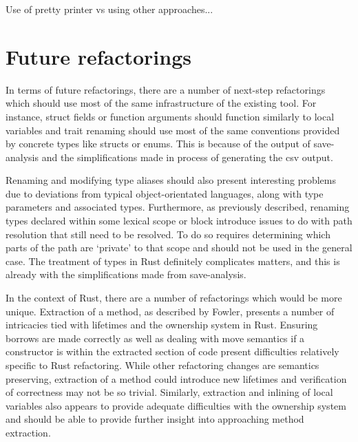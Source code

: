 Use of pretty printer vs using other approaches...

\section{Future refactorings}
In terms of future refactorings, there are a number of next-step refactorings which should use most of the same infrastructure of the existing tool. For instance, struct fields or function arguments should function similarly to local variables and trait renaming should use most of the same conventions provided by concrete types like structs or enums. This is because of the output of save-analysis and the simplifications made in process of generating the csv output.


Renaming and modifying type aliases should also present interesting problems due to deviations from typical object-orientated languages, along with type parameters and associated types. Furthermore, as previously described, renaming types declared within some lexical scope or block introduce issues to do with path resolution that still need to be resolved. To do so requires determining which parts of the path are `private' to that scope and should not be used in the general case. The treatment of types in Rust definitely complicates matters, and this is already with the simplifications made from save-analysis.

In the context of Rust, there are a number of refactorings which would be more unique. Extraction of a method, as described by Fowler, presents a number of intricacies tied with lifetimes and the ownership system in Rust. Ensuring borrows are made correctly as well as dealing with move semantics if a constructor is within the extracted section of code present difficulties relatively specific to Rust refactoring. While other refactoring changes are semantics preserving, extraction of a method could introduce new lifetimes and verification of correctness may not be so trivial. Similarly, extraction and inlining of local variables also appears to provide adequate difficulties with the ownership system and should be able to provide further insight into approaching method extraction.

